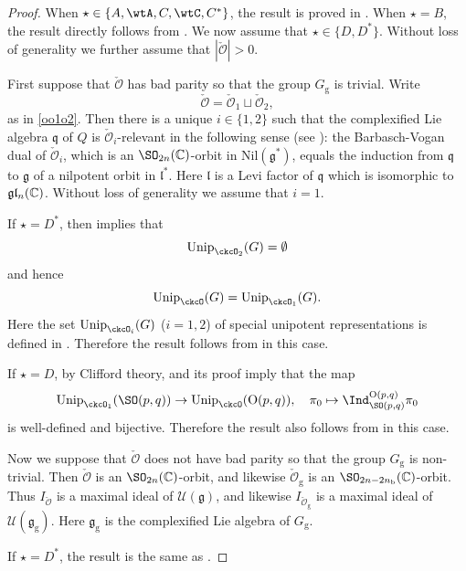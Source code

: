 \documentclass[11pt,a4paper]{amsart}
\def\abs#1{\left|{#1}\right|}
\newcommand{\CO}{{\mathcal {O}}}
\newcommand{\CU}{{\mathcal {U}}}
\newcommand{\oO}{\operatorname{O}}
\newcommand{\g}{\mathfrak g}
\numberwithin{equation}{section}
\theoremstyle{remark}
\def\Unip{\mathrm{Unip}}
\begin{document}
\begin{proof}
When $\star\in\{A, \wtA, C, \wtC, C^*\}$, the result is proved in  \cite[Theorems 2.17 and 2.21]{BMSZa}. When $\star=B$, the result directly follows from \cite[Theorem 2.21]{BMSZa}. We now assume that $\star\in \{D, D^*\}$. Without loss of generality we further assume that $\abs{\check \CO}>0$. 


First suppose that $\check \CO$ has bad parity so that the group $G_\mathrm g$ is trivial. Write 
\[
  \check \CO=\check \CO_1\sqcup \check \CO_2,
\]
as in \eqref{oo1o2}.  Then there is a unique $i\in \{1,2\}$ such that the complexified Lie algebra $\mathfrak q$ of $Q$ is   $\check \CO_i$-relevant in the following sense (see \cite[Section 2.6]{BMSZa}): the Barbasch-Vogan dual of $\check \CO_i$, which is an $\SO_{2n}(\C)$-orbit in $\mathrm{Nil}(\g^*)$,  equals the induction from $\mathfrak q$ to $\g$ of a nilpotent orbit  in $\mathfrak l^*$. Here $\mathfrak l$ is a Levi factor of $\mathfrak q$ which is isomorphic to $\g\mathfrak l_n(\C)$. 
Without loss of generality we assume that $i=1$. 

If $\star=D^*$, then \cite[Theorem 2.21]{BMSZa} implies that
\[
  \Unip_{\ckcO_2 }(G)=\emptyset
\]
and hence 
\[
  \Unip_{\ckcO }(G)=\Unip_{\ckcO_1 }(G).
\]
Here the set $\Unip_{\ckcO_i }(G)$ ($i=1,2$) of special unipotent representations is defined in \cite[Section 2.3]{BMSZa}.  Therefore the result follows from \cite[Theorem 2.21]{BMSZa} in this case. 


If $\star=D$,  by Clifford theory,  and its proof imply that the map
\[
  \Unip_{\ckcO_1 }(\SO(p,q))\rightarrow \Unip_{\ckcO }(\oO(p,q)), \quad \pi_0\mapsto \Ind_{\SO(p,q)}^{\oO(p,q)} \pi_0
\]
is well-defined and bijective. Therefore the result also follows from \cite[Theorem 2.21]{BMSZa} in this case.   



Now we  suppose that $\check \CO$ does not have bad parity so that the group $G_\mathrm g$ is non-trivial.
Then $\check \CO$ is an $\SO_{2n}(\C)$-orbit, and likewise $\check \CO_\mathrm g$ is an $\SO_{2n-2n_\mathrm b}(\C)$-orbit. Thus $I_{\check \CO}$ is a maximal ideal of $\CU(\g)$, and likewise $I_{\check \CO_\mathrm g}$ is a maximal ideal of $\CU(\g_\mathrm g)$. Here  $\g_\mathrm g$ is the complexified Lie algebra of $G_\mathrm g$. 

If $\star=D^*$, the result is the same as  \cite[Theorem 2.21]{BMSZa}. 


\end{proof}
\end{document}
